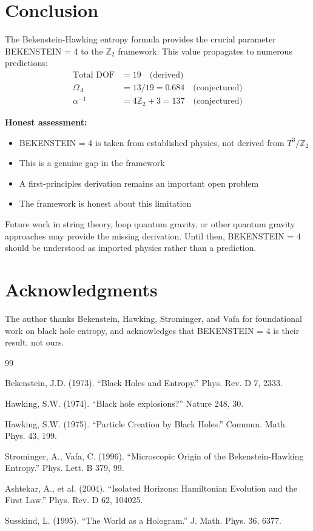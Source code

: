\documentclass[12pt,a4paper]{article}
\begin{document}
\section{Conclusion}

The Bekenstein-Hawking entropy formula provides the crucial parameter BEKENSTEIN = 4 to the $\mathbb{Z}_2$ framework. This value propagates to numerous predictions:
\begin{align}
\text{Total DOF} &= 19 \quad \text{(derived)} \\
\Omega_\Lambda &= 13/19 = 0.684 \quad \text{(conjectured)} \\
\alpha^{-1} &= 4\mathbb{Z}_2 + 3 = 137 \quad \text{(conjectured)}
\end{align}

\textbf{Honest assessment:}
\begin{itemize}
    \item BEKENSTEIN = 4 is taken from established physics, not derived from $T^3/\mathbb{Z}_2$
    \item This is a genuine gap in the framework
    \item A first-principles derivation remains an important open problem
    \item The framework is honest about this limitation
\end{itemize}

Future work in string theory, loop quantum gravity, or other quantum gravity approaches may provide the missing derivation. Until then, BEKENSTEIN = 4 should be understood as imported physics rather than a prediction.

\section*{Acknowledgments}

The author thanks Bekenstein, Hawking, Strominger, and Vafa for foundational work on black hole entropy, and acknowledges that BEKENSTEIN = 4 is their result, not ours.

\begin{thebibliography}{99}

Bekenstein, J.D. (1973). ``Black Holes and Entropy.'' Phys. Rev. D 7, 2333.

Hawking, S.W. (1974). ``Black hole explosions?'' Nature 248, 30.

Hawking, S.W. (1975). ``Particle Creation by Black Holes.'' Commun. Math. Phys. 43, 199.

Strominger, A., Vafa, C. (1996). ``Microscopic Origin of the Bekenstein-Hawking Entropy.'' Phys. Lett. B 379, 99.

Ashtekar, A., et al. (2004). ``Isolated Horizons: Hamiltonian Evolution and the First Law.'' Phys. Rev. D 62, 104025.

Susskind, L. (1995). ``The World as a Hologram.'' J. Math. Phys. 36, 6377.

\end{thebibliography}
\end{document}
